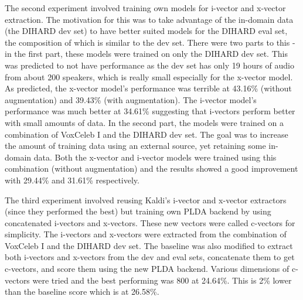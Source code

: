 		The second experiment involved training own models for i-vector and x-vector extraction. The motivation for this was to take advantage of the in-domain data (the DIHARD dev set) to have better suited models for the DIHARD eval set, the composition of which is similar to the dev set. There were two parts to this - in the first part, these models were trained on only the DIHARD dev set. This was predicted to not have performance as the dev set has only 19 hours of audio from about 200 speakers, which is really small especially for the x-vector model. As predicted, the x-vector model's performance was terrible at 43.16\% (without augmentation) and 39.43\% (with augmentation). The i-vector model's performance was much better at 34.61\% suggesting that i-vectors perform better with small amounts of data. In the second part, the models were trained on a combination of VoxCeleb I and the DIHARD dev set. The goal was to increase the amount of training data using an external source, yet retaining some in-domain data. Both the x-vector and i-vector models were trained using this combination (without augmentation) and the results showed a good improvement with 29.44\% and 31.61\% respectively.
		
		The third experiment involved reusing Kaldi's i-vector and x-vector extractors (since they performed the best) but training own PLDA backend by using concatenated i-vectors and x-vectors. These new vectors were called c-vectors for simplicity. The i-vectors and x-vectors were extracted from the combination of VoxCeleb I and the DIHARD dev set. The baseline was also modified to extract both i-vectors and x-vectors from the dev and eval sets, concatenate them to get c-vectors, and score them using the new PLDA backend. Various dimensions of c-vectors were tried and the best performing was 800 at 24.64\%. This is 2\% lower than the baseline score which is at 26.58\%.
		
		
		